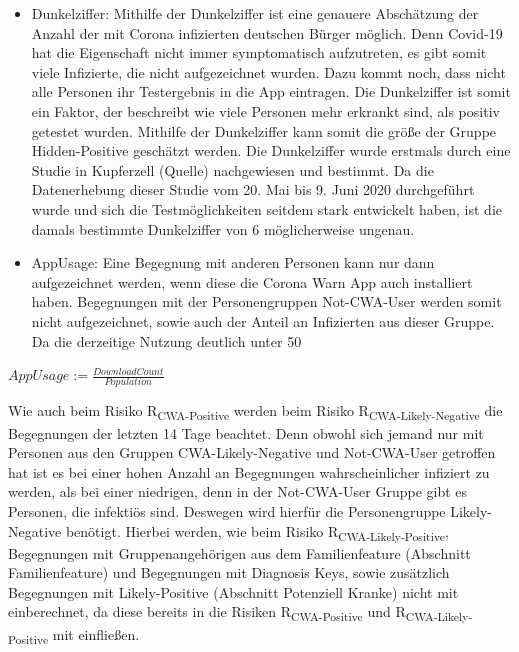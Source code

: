 \documentclass[conference]{IEEEtran}
\begin{document}
\begin{itemize}
	\item Dunkelziffer: Mithilfe der Dunkelziffer ist eine genauere Abschätzung der Anzahl der mit Corona infizierten deutschen Bürger möglich. Denn Covid-19 hat die Eigenschaft nicht immer symptomatisch aufzutreten, es gibt somit viele Infizierte, die nicht aufgezeichnet wurden. Dazu kommt noch, dass nicht alle Personen ihr Testergebnis in die App eintragen. Die Dunkelziffer ist somit  ein Faktor, der beschreibt wie viele Personen mehr erkrankt sind, als positiv getestet wurden. Mithilfe der Dunkelziffer kann somit die größe der Gruppe Hidden-Positive geschätzt werden.
	Die Dunkelziffer wurde erstmals durch eine Studie in Kupferzell (Quelle) nachgewiesen und bestimmt. Da die Datenerhebung dieser Studie vom 20. Mai bis 9. Juni 2020 durchgeführt wurde und sich die Testmöglichkeiten seitdem stark entwickelt haben, ist die damals bestimmte Dunkelziffer von 6 möglicherweise ungenau. 
	\item  AppUsage: Eine Begegnung mit anderen Personen kann nur dann aufgezeichnet werden, wenn diese die Corona Warn App auch installiert haben. Begegnungen mit der Personengruppen Not-CWA-User werden somit nicht aufgezeichnet, sowie auch der Anteil an Infizierten aus dieser Gruppe. Da die derzeitige Nutzung deutlich unter 50%
\end{itemize}

\centerline{\text{ }}
\centerline{$AppUsage := \frac{DownloadCount}{Population}$}
\centerline{\text{ }}

Wie auch beim Risiko R\textsubscript{CWA-Positive} werden beim Risiko R\textsubscript{CWA-Likely-Negative} die Begegnungen der letzten 14 Tage beachtet.
Denn obwohl sich jemand nur mit Personen aus den Gruppen CWA-Likely-Negative und Not-CWA-User getroffen hat
ist es bei einer hohen Anzahl an Begegnungen wahrscheinlicher infiziert zu werden, als bei einer niedrigen, denn in der Not-CWA-User Gruppe gibt es Personen, die infektiös sind. 
Deswegen wird hierfür die Personengruppe Likely-Negative benötigt. 
Hierbei werden, wie beim Risiko R\textsubscript{CWA-Likely-Positive}, 
Begegnungen mit Gruppenangehörigen aus dem Familienfeature (Abschnitt Familienfeature) und Begegnungen mit Diagnosis Keys, 
sowie zusätzlich Begegnungen mit Likely-Positive (Abschnitt Potenziell Kranke)  nicht mit einberechnet, 
da diese bereits in die Risiken R\textsubscript{CWA-Positive} und R\textsubscript{CWA-Likely-Positive} mit einfließen.
\end{document}
